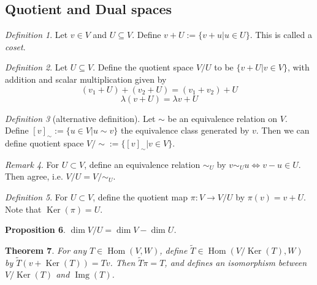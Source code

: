 \documentclass[12pt]{amsart}
\renewcommand{\ker}{\Ker}
\DeclareMathOperator{\Ker}{Ker}
\DeclareMathOperator{\Hom}{Hom}
\DeclareMathOperator{\img}{Img}
\newtheorem{theorem}{Theorem}[section]
\newtheorem{proposition}[theorem]{Proposition}
\theoremstyle{remark}
\newtheorem{remark}[theorem]{Remark}
\newtheorem{definition}[theorem]{Definition}
\numberwithin{equation}{section}
\begin{document}
	\subsection{Quotient and Dual spaces}
	\begin{definition}
		Let $v\in V$ and $U\subseteq V$. Define  $v+U := \{v+u|u\in U\}$. This is called a \emph{coset}.
	\end{definition}
	\begin{definition}\label{def:quotient_1}
		Let $U\subseteq V$. Define the quotient space $V/U$ to be $\{v+U|v\in V\}$, with addition and scalar multiplication given by
		\[(v_1+U)+(v_2+U) = (v_1+v_2)+U\]
		\[\lambda(v+U)=\lambda v+U\]
	\end{definition}
	\begin{definition}[alternative definition]\label{def:quotient_2} Let $\sim$ be an equivalence relation on $V$. Define $[v]_\sim:=\{u\in V|u\sim v\}$ the equivalence class generated by $v$. Then we can define quotient space $V/\sim:=\{[v]_\sim|v\in V\}$.
	\end{definition}
	\begin{remark}
		For $U\subset V$, define an equivalence relation $\sim_U$ by $v\sim_U u \iff v-u\in U$. Then  agree, i.e. $V/U = V/\sim_U$.
	\end{remark}
	\begin{definition}
		For $U\subset V$, define the quotient map $\pi: V\to V/U$ by $\pi(v)=v+U$. Note that $\ker(\pi)=U$.
	\end{definition}
	\begin{proposition}
		$\dim V/U = \dim V-\dim U$.
	\end{proposition}
	\begin{theorem}
		For any $T\in\Hom(V,W)$, define $\tilde T\in\Hom(V/\ker(T),W)$ by  $\tilde T(v+\ker(T))=Tv$. Then $\tilde T\pi = T$, and defines an isomorphism between $V/\ker(T)$ and $\img(T)$.
	\end{theorem}
	
\end{document}
